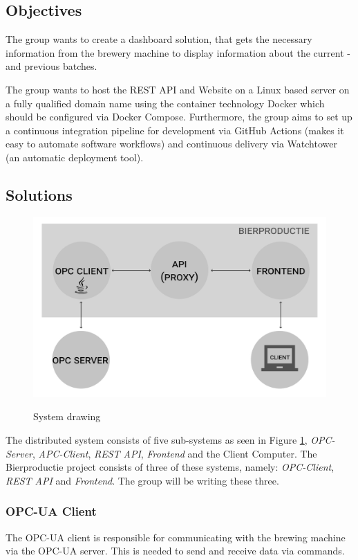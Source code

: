 \subsection{Objectives}
The group wants to create a dashboard solution, that gets the necessary
information from the brewery machine to display information about the current
- and previous batches.

The group wants to host the REST API and Website on a Linux based server on a
fully qualified domain name using the container technology Docker which should
be configured via Docker Compose. Furthermore, the group aims to set up a
continuous integration pipeline for development via GitHub Actions (makes it
easy to automate software workflows) and continuous delivery via Watchtower (an
automatic deployment tool).

\subsection{Solutions}
\begin{figure}[h]
\centering 
\includegraphics[scale=0.3]{../project_proposal/images/system_drawing.pdf}
\label{figure:System_drawing}
\caption{System drawing} 
\end{figure}

The distributed system consists of five sub-systems as seen in Figure
\ref{figure:System_drawing}, \textit{OPC-Server}, \textit{APC-Client},
\textit{REST API}, \textit{Frontend} and the Client Computer. The Bierproductie
project consists of three of these systems, namely: \textit{OPC-Client},
\textit{REST API} and \textit{Frontend}. The group will be writing these three.

\subsubsection{OPC-UA Client}
The OPC-UA client is responsible for communicating with the brewing machine via
the OPC-UA server. This is needed to send and receive data via
commands.

